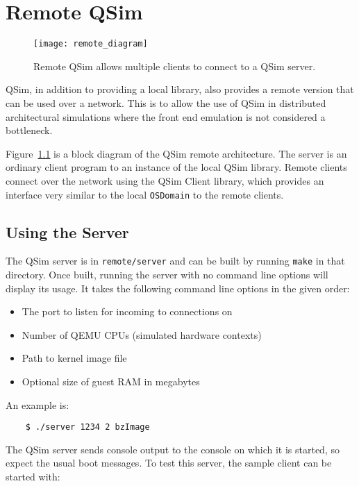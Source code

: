 \documentclass[letterpaper, 10pt]{book}
\begin{document}
\chapter{Remote QSim} \label{chap:remote}

\begin{figure}
\begin{centering}
\texttt{[image: remote\_diagram]}
\caption{Remote QSim allows multiple clients to connect to a QSim server.}
\label{fig:remote}
\end{centering}
\end{figure}

QSim, in addition to providing a local library, also provides a remote version
that can be used over a network. This is to allow the use of QSim in
distributed architectural simulations where the front end emulation is not
considered a bottleneck.

Figure~\ref{fig:remote} is a block diagram of the QSim remote architecture. The
server is an ordinary client program to an instance of the local QSim library.
Remote clients connect over the network using the QSim Client library, which
provides an interface very similar to the local \texttt{OSDomain} to the remote
clients.

\section{Using the Server}

The QSim server is in \texttt{remote/server} and can be built by running
\texttt{make} in that directory. Once built, running the server with no command
line options will display its usage. It takes the following command line options
in the given order:

\begin{itemize}
  \item{The port to listen for incoming to connections on}
  \item{Number of QEMU CPUs (simulated hardware contexts)}
  \item{Path to kernel image file}
  \item{Optional size of guest RAM in megabytes}
\end{itemize}

An example is:

\begin{verbatim}
    $ ./server 1234 2 bzImage
\end{verbatim}

The QSim server sends console output to the console on which it is started, so
expect the usual boot messages. To test this server, the sample client can be
started with:
\end{document}
